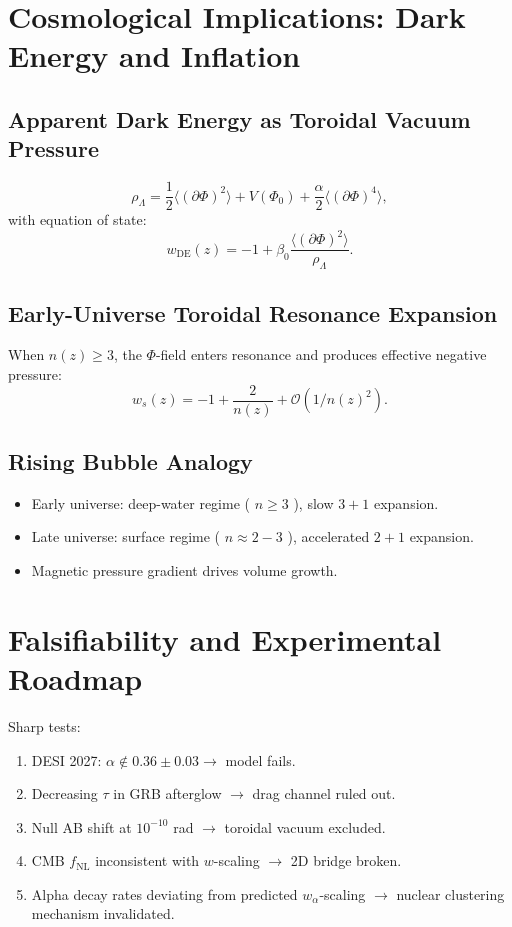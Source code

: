\documentclass[11pt,a4paper]{article}
\begin{document}
\section{Cosmological Implications: Dark Energy and Inflation}

\subsection{Apparent Dark Energy as Toroidal Vacuum Pressure}
\begin{equation}
\rho_{\Lambda} = \frac{1}{2}\langle (\partial \Phi)^{2}\rangle +V(\Phi_{0}) + \frac{\alpha}{2}\langle (\partial \Phi)^{4}\rangle , \tag{65}
\end{equation}
with equation of state:
\begin{equation}
w_{\mathrm{DE}}(z) = -1 + \beta_{0}\frac{\langle(\partial\Phi)^{2}\rangle}{\rho_{\Lambda}}. \tag{66}
\end{equation}

\subsection{Early-Universe Toroidal Resonance Expansion}
When \(n(z) \geq 3\), the \(\Phi\)-field enters resonance and produces effective negative pressure:
\begin{equation}
w_{s}(z) = -1 + \frac{2}{n(z)} +\mathcal{O}(1 / n(z)^{2}). \tag{67}
\end{equation}

\subsection{Rising Bubble Analogy}
\begin{itemize}
\item Early universe: deep-water regime ( \(n \geq 3\) ), slow \(3+1\) expansion.
\item Late universe: surface regime ( \(n \approx 2 - 3\) ), accelerated \(2+1\) expansion.
\item Magnetic pressure gradient drives volume growth.
\end{itemize}

\section{Falsifiability and Experimental Roadmap}
Sharp tests:
\begin{enumerate}
\item DESI 2027: \(\alpha \notin 0.36 \pm 0.03 \rightarrow\) model fails.
\item Decreasing \(\tau\) in GRB afterglow \(\rightarrow\) drag channel ruled out.
\item Null AB shift at \(10^{-10}\) rad \(\rightarrow\) toroidal vacuum excluded.
\item CMB \(f_{\mathrm{NL}}\) inconsistent with \(w\)-scaling \(\rightarrow\) 2D bridge broken.
\item Alpha decay rates deviating from predicted \(w_{\alpha}\)-scaling \(\rightarrow\) nuclear clustering mechanism invalidated.
\end{enumerate}
\end{document}

